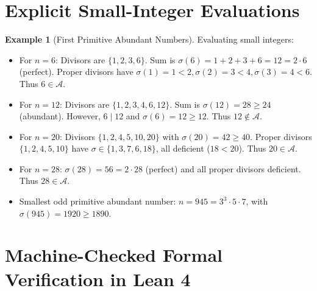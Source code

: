 \documentclass[11pt,a4paper]{article}
\theoremstyle{definition}
\newtheorem{example}[theorem]{Example}
\begin{document}
\section{Explicit Small-Integer Evaluations}

\begin{example}[First Primitive Abundant Numbers]\label{ex:small_prim_abundant}
Evaluating small integers:
\begin{itemize}
    \item For $n = 6$: Divisors are $\{1, 2, 3, 6\}$. Sum is $\sigma(6) = 1 + 2 + 3 + 6 = 12 = 2 \cdot 6$ (perfect).
    Proper divisors have $\sigma(1) = 1 < 2, \sigma(2) = 3 < 4, \sigma(3) = 4 < 6$. Thus $6 \in \mathcal{A}$.
    \item For $n = 12$: Divisors are $\{1, 2, 3, 4, 6, 12\}$. Sum is $\sigma(12) = 28 \ge 24$ (abundant).
    However, $6 \mid 12$ and $\sigma(6) = 12 \ge 12$. Thus $12 \notin \mathcal{A}$.
    \item For $n = 20$: Divisors $\{1, 2, 4, 5, 10, 20\}$ with $\sigma(20) = 42 \ge 40$.
    Proper divisors $\{1, 2, 4, 5, 10\}$ have $\sigma \in \{1, 3, 7, 6, 18\}$, all deficient ($18 < 20$). Thus $20 \in \mathcal{A}$.
    \item For $n = 28$: $\sigma(28) = 56 = 2 \cdot 28$ (perfect) and all proper divisors deficient. Thus $28 \in \mathcal{A}$.
    \item Smallest odd primitive abundant number: $n = 945 = 3^3 \cdot 5 \cdot 7$, with $\sigma(945) = 1920 \ge 1890$.
\end{itemize}
\end{example}

\section{Machine-Checked Formal Verification in Lean 4}
\end{document}
